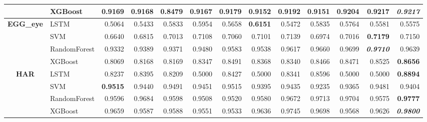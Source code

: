 \begin{table}[H]
\begin{adjustbox}{max width=14cm}
\begin{tabular}{|c|l|r|r|r|r|r|r|r|r|r|r|r|}
			                      & XGBoost      & 0.9169                   & 0.9168          & 0.8479          & 0.9167          & 0.9179                   & 0.9152          & 0.9192 & 0.9151 & 0.9204          & 0.9217                   & \textit{\textbf{0.9217}} \\
			\hline
			\textbf{EGG\_eye}     & LSTM         & 0.5064                   & 0.5433          & 0.5833          & 0.5954          & 0.5658                   & \textbf{0.6151} & 0.5472 & 0.5835 & 0.5764          & 0.5581                   & 0.5575                   \\
			                      & SVM          & 0.6640                   & 0.6815          & 0.7013          & 0.7108          & 0.7060                   & 0.7101          & 0.7139 & 0.6974 & 0.7016          & \textbf{0.7179}          & 0.7150                   \\
			                      & RandomForest & 0.9332                   & 0.9389          & 0.9371          & 0.9480          & 0.9583                   & 0.9538          & 0.9617 & 0.9660 & 0.9699          & \textit{\textbf{0.9710}} & 0.9639                   \\
			                      & XGBoost      & 0.8069                   & 0.8168          & 0.8169          & 0.8347          & 0.8491                   & 0.8368          & 0.8340 & 0.8466 & 0.8471          & 0.8525                   & \textbf{0.8656}          \\
			\hline
			\textbf{HAR}          & LSTM         & 0.8237                   & 0.8395          & 0.8209          & 0.5000          & 0.8427                   & 0.5000          & 0.8341 & 0.8596 & 0.5000          & 0.5000                   & \textbf{0.8894}          \\
			                      & SVM          & \textbf{0.9515}          & 0.9440          & 0.9491          & 0.9451          & 0.9515                   & 0.9395          & 0.9435 & 0.9235 & 0.9365          & 0.9481                   & 0.9404                   \\
			                      & RandomForest & 0.9596                   & 0.9684          & 0.9598          & 0.9508          & 0.9520                   & 0.9580          & 0.9672 & 0.9713 & 0.9704          & 0.9575                   & \textbf{0.9777}          \\
			                      & XGBoost      & 0.9659                   & 0.9587          & 0.9588          & 0.9551          & 0.9533                   & 0.9636          & 0.9745 & 0.9698 & 0.9568          & 0.9626                   & \textit{\textbf{0.9800}} \\

\end{tabular}
\end{adjustbox}
\end{table}
